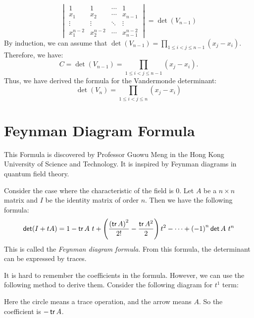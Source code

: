 \[
  \begin{vmatrix}
    1           & 1           & \cdots & 1                 \\
    x_1         & x_2         & \cdots & x_{n - 1}         \\
    \vdots      & \vdots      & \ddots & \vdots            \\
    x_1^{n - 2} & x_2^{n - 2} & \cdots & x_{n - 1}^{n - 2}
  \end{vmatrix} = \det(V_{n - 1})
\]
By induction, we can assume that $\det(V_{n - 1}) = \prod_{1 \leq i < j \leq n - 1} (x_j - x_i)$. Therefore, we have:
\[
  C = \det(V_{n - 1}) = \prod_{1 \leq i < j \leq n - 1} (x_j - x_i).
\]
Thus, we have derived the formula for the Vandermonde determinant:
\[
  \det(V_n) = \prod_{1 \leq i < j \leq n} (x_j - x_i)
\]

\section{Feynman Diagram Formula}

This Formula is discovered by Professor Guowu Meng in the Hong Kong University of Science and Technology. It is inspired by Feynman diagrams in quantum field theory.

Consider the case where the characteristic of the field is 0. Let $A$ be a $n \times n$ matrix and $I$ be the identity matrix of order $n$. Then we have the following formula:
\[
  \operatorname{\text{\normalfont\sffamily det}}(I + tA) = 1 - \operatorname{\text{\normalfont\sffamily tr}} A \ t + \left(\frac{{(\operatorname{\text{\normalfont\sffamily tr}} A)}^2}{2!} - \frac{\operatorname{\text{\normalfont\sffamily tr}} A^2}{2}\right) t^2 - \cdots + {(-1)}^n \operatorname{\text{\normalfont\sffamily det}} A \ t^n
\]
This is called the \emph{Feynman diagram formula}. From this formula, the determinant can be expressed by traces.

It is hard to remember the coefficients in the formula. However, we can use the following method to derive them. Consider the following diagram for $t^1$ term:
\begin{center}
\end{center}
Here the circle means a trace operation, and the arrow means $A$. So the coefficient is $- \operatorname{\text{\normalfont\sffamily tr}} A$.

